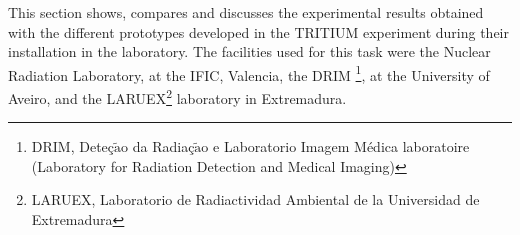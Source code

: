 This section shows, compares and discusses the experimental results obtained with the different prototypes developed in the TRITIUM experiment during their installation in the laboratory. The facilities used for this task were the Nuclear Radiation Laboratory, at the IFIC, Valencia, the DRIM \footnote{DRIM, Deteç$\tilde{\text{a}}$o da Radiaç$\tilde{\text{a}}$o e Laboratorio Imagem Médica laboratoire (Laboratory for Radiation Detection and Medical Imaging)}, at the University of Aveiro, and the LARUEX\footnote{LARUEX, Laboratorio de Radiactividad Ambiental de la Universidad de Extremadura} laboratory in Extremadura.